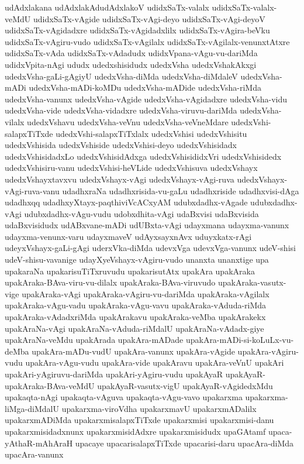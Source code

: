 {udAdxlakana
udAdxlakAdudAdxlakoV
udidxSaTx-valalx
udidxSaTx-valalx-veMdU
udidxSaTx-vAgide
udidxSaTx-vAgi-deyo
udidxSaTx-vAgi-deyoV
udidxSaTx-vAgidadxre
udidxSaTx-vAgidadxlilx
udidxSaTx-vAgira-beVku
udidxSaTx-vAgiru-vudo
udidxSaTx-vAgilalx
udidxSaTx-vAgilalx-venunxtAtxre
udidxSaTx-vAda
udidxSaTx-vAdadudx
udidxVpana-vAgu-vu-dariMda
udidxVpita-nAgi
ududx
udedxshisidudx
udedxVsha
udedxVshakAkxgi
udedxVsha-gaLi-gAgiyU
udedxVsha-diMda
udedxVsha-diMdaleV
udedxVsha-mADi
udedxVsha-mADi-koMDu
udedxVsha-mADide
udedxVsha-riMda
udedxVsha-vanunx
udedxVsha-vAgide
udedxVsha-vAgidadxre
udedxVsha-vidu
udedxVsha-vide
udedxVsha-vidadxre
udedxVsha-viruvu-dariMda
udedxVsha-vilalx
udedxVshavu
udedxVsha-veVnu
udedxVsha-veVneMdare
udedxVshi-salapxTiTxde
udedxVshi-salapxTiTxlalx
udedxVshisi
udedxVshisitu
udedxVshisida
udedxVshiside
udedxVshisi-deyo
udedxVshisidadx
udedxVshisidadxLo
udedxVshisidAdxga
udedxVshisididxVri
udedxVshisidedx
udedxVshisiru-vanu
udedxVshisi-heVLide
udedxVshisuva
udedxVshayx
udedxVshayxtavxvu
udedxVshayx-vAgi
udedxVshayx-vAgi-ruva
udedxVshayx-vAgi-ruva-vanu
udadhxraNa
udadhxrisida-vu-gaLu
udadhxriside
udadhxvisi-dAga
udadhxqq
udadhxyXtayx-paqthiviVcACxyAM
udubxdadhx-vAgade
udubxdadhx-vAgi
udubxdadhx-vAgu-vudu
udobxdhita-vAgi
udaBxvisi
udaBxvisida
udaBxvisidudx
udABxvane-mADi
udUBxta-vAgi
udayxmana
udayxma-vanunx
udayxma-venunx-varu
udayxmaveV
udAyxsayxnAvx
uduyxkatx-rAgi
udeyxVshayx-gaLi-gAgi
uderxVka-diMda
udevxVga
udevxVga-vanunx
udeV-shisi
udeV-shisu-vavanige
udayXyeVshayx-vAgiru-vudo
unanxta
unanxtige
upa
upakaraNa
upakarisuTiTxruvudu
upakarisutAtx
upakAra
upakAraka
upakAraka-BAva-viru-vu-dilalx
upakAraka-BAva-viruvudo
upakAraka-vasutx-vige
upakAraka-vAgi
upakAraka-vAgiru-vu-dariMda
upakAraka-vAgilalx
upakAraka-vAgu-vadu
upakAraka-vAgu-vavu
upakAraka-vAduda-riMda
upakAraka-vAdadxriMda
upakArakavu
upakAraka-veMba
upakArakekx
upakAraNa-vAgi
upakAraNa-vAduda-riMdalU
upakAraNa-vAdadx-giye
upakAraNa-veMdu
upakArada
upakAra-mADade
upakAra-mADi-si-koLuLx-vu-deMba
upakAra-mADu-vudU
upakAra-vanunx
upakAra-vAgide
upakAra-vAgiru-vudu
upakAra-vAgu-vudu
upakAra-vide
upakAravu
upakAra-veVnU
upakAri
upakAri-yAgiruvu-dariMda
upakAri-yAgiru-vudu
upakAyaR
upakAyaR-upakAraka-BAva-veMdU
upakAyaR-vasutx-vigU
upakAyaR-vAgidedxMdu
upakaqta-nAgi
upakaqta-vAguva
upakaqta-vAgu-vavo
upakarxma
upakarxma-liMga-diMdalU
upakarxma-viroVdha
upakarxmavU
upakarxmADalilx
upakarxmADiMda
upakarxmisalapxTiTxde
upakarxmisi
upakarxmisi-danu
upakarxmisidadxnunx
upakarxmisidAdxre
upakarxmisidudx
upaGAtamf
upaca-yAthaR-mAhAraH
upacaye
upacarisalapxTiTxde
upacarisi-daru
upacAra-diMda
upacAra-vanunx
}

